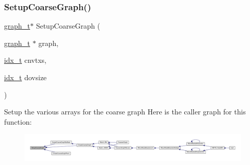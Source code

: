 \subsubsection{\texorpdfstring{Setup\+Coarse\+Graph()}{SetupCoarseGraph()}}
{\footnotesize\ttfamily \hyperlink{a00734}{graph\+\_\+t}$\ast$ Setup\+Coarse\+Graph (\begin{DoxyParamCaption}\item[{\hyperlink{a00734}{graph\+\_\+t} $\ast$}]{graph,  }\item[{\hyperlink{a00876_aaa5262be3e700770163401acb0150f52}{idx\+\_\+t}}]{cnvtxs,  }\item[{\hyperlink{a00876_aaa5262be3e700770163401acb0150f52}{idx\+\_\+t}}]{dovsize }\end{DoxyParamCaption})}

Setup the various arrays for the coarse graph Here is the caller graph for this function\+:\nopagebreak
\begin{figure}[H]
\begin{center}
\leavevmode
\includegraphics[width=350pt]{a00182_a113522304bf628b09d0b69b4db05050e_icgraph}
\end{center}
\end{figure}
